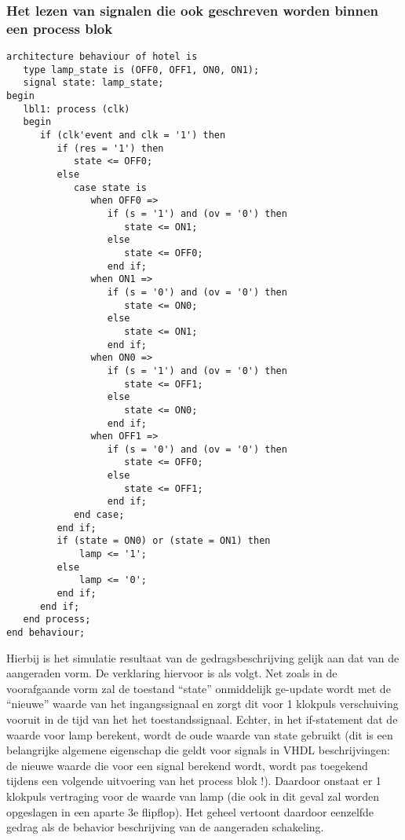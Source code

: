 \subsubsection{Het lezen van signalen die ook geschreven worden binnen een process blok}
\begin{small}
\begin{verbatim}
architecture behaviour of hotel is
   type lamp_state is (OFF0, OFF1, ON0, ON1);
   signal state: lamp_state;
begin
   lbl1: process (clk)
   begin
      if (clk'event and clk = '1') then
         if (res = '1') then
            state <= OFF0;
         else 
            case state is
               when OFF0 =>
                  if (s = '1') and (ov = '0') then
                     state <= ON1; 
                  else
                     state <= OFF0;
                  end if;
               when ON1 =>
                  if (s = '0') and (ov = '0') then
                     state <= ON0;
                  else
                     state <= ON1;
                  end if;
               when ON0 =>
                  if (s = '1') and (ov = '0') then
                     state <= OFF1; 
                  else
                     state <= ON0; 
                  end if;
               when OFF1 =>
                  if (s = '0') and (ov = '0') then
                     state <= OFF0;
                  else
                     state <= OFF1;
                  end if;
            end case;
         end if;
         if (state = ON0) or (state = ON1) then
             lamp <= '1';
         else
             lamp <= '0';
         end if;
      end if;
   end process;
end behaviour;
\end{verbatim}
\end{small}
Hierbij is het simulatie resultaat van de gedragsbeschrijving 
gelijk aan dat van de aangeraden vorm.
De verklaring hiervoor is als volgt.
Net zoals in de voorafgaande vorm zal
de toestand ``state'' onmiddelijk ge-update wordt met de ``nieuwe'' waarde 
van het ingangssignaal en zorgt dit voor 1 klokpuls verschuiving
vooruit in de tijd van het het toestandssignaal.
Echter, in het if-statement dat de waarde voor lamp berekent,
wordt de oude waarde van state gebruikt (dit is een belangrijke 
algemene eigenschap die geldt voor signals in VHDL beschrijvingen:
de nieuwe waarde die voor een signal berekend wordt,
wordt pas toegekend tijdens een volgende uitvoering van
het process blok !).
Daardoor onstaat er 1 klokpuls vertraging voor de waarde van lamp
(die ook in dit geval zal worden opgeslagen in een aparte 3e flipflop).
Het geheel vertoont daardoor eenzelfde gedrag als de behavior beschrijving
van de aangeraden schakeling.

